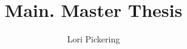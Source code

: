 \documentclass[12pt]{report}
\begin{document}
\title{Main. Master Thesis}
\author{Lori Pickering}
\maketitle
\end{document}
